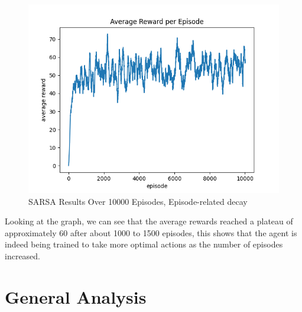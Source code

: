 \documentclass[nohyperref]{article}
\theoremstyle{plain}
\theoremstyle{definition}
\theoremstyle{remark}
\begin{document}
\begin{figure}[H] %
    \centering
    \includegraphics[width=1\linewidth]{sarsa-average-10k-epsilon05.png}
    \caption{SARSA Results Over 10000 Episodes, Episode-related decay}
\end{figure}

Looking at the graph, we can see that the average rewards reached a plateau of approximately 60 after about 1000 to 1500 episodes, this shows that the agent is indeed being trained to
take more optimal actions as the number of episodes increased.





\section{General Analysis}
\end{document}
